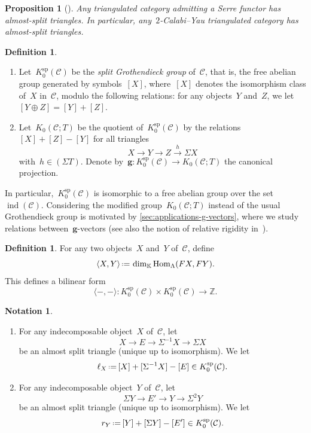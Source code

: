 \documentclass{amsart}
\newtheorem{proposition}[theorem]{Proposition}
\theoremstyle{definition}
\newtheorem{definition}[theorem]{Definition}
\newtheorem{notation}[theorem]{Notation}
\newcommand{\Z}{\mathbb{Z}} %
\renewcommand{\b}[1]{{\boldsymbol{#1}}} %
\newcommand{\eqdef}{\mbox{\,\raisebox{0.2ex}{\scriptsize\ensuremath{\mathrm:}}\ensuremath{=}\,}} %
\newcommand{\darkblue}{\color{darkblue}} %
\newcommand{\defn}[1]{\textsl{\darkblue #1}} %
\newcommand{\field}{\mathbb{K}}
\newcommand{\cat}{\mathcal{C}}
\newcommand{\Hom}[1]{\operatorname{Hom}_{#1}}
\newcommand{\susp}{\Sigma}
\newcommand{\spl}{\operatorname{sp}}
\newcommand{\Ksp}{K_0^{\spl}}
\newcommand{\ind}{\operatorname{ind}}
\begin{document}
\begin{proposition}[{\cite[Prop.~I.2.3]{ReitenVandenbergh}}]
Any triangulated category admitting a Serre functor has almost-split triangles. In particular, any~$2$-Calabi--Yau triangulated category has almost-split triangles.
\end{proposition}

\begin{definition}
\label{def:grothendieck-group}
\begin{enumerate}
\item Let~$\Ksp(\cat)$ be the \defn{split Grothendieck group} of~$\cat$, that is, the free abelian group generated by symbols~$[X]$, where~$[X]$ denotes the isomorphism class of~$X$ in~$\cat$, modulo the following relations: for any objects~$Y$ and~$Z$, we let~$[Y\oplus Z] = [Y] + [Z]$. 
  
\item Let~$K_0(\cat ; T)$ be the quotient of~$\Ksp(\cat)$ by the relations~$[X]+[Z]-[Y]$ for all triangles
\[
X\xrightarrow{} Y \xrightarrow{} Z \xrightarrow{h} \susp X
\]
with~$h \in (\susp T)$. Denote by~$\b{g}:\Ksp(\cat) \to K_0(\cat ; T)$ the canonical projection.
\end{enumerate}
\end{definition}

In particular,~$\Ksp(\cat)$ is isomorphic to a free abelian group over the set~$\ind(\cat)$.
Considering the modified group~$K_0(\cat ; T)$ instead of the usual Grothendieck group is motivated by \cref{sec:applications-g-vectors}, where we study relations between~$\b{g}$-vectors (see also the notion of relative rigidity in~\cite{YangZhu-Relative}).

\begin{definition}
\label{def:bilinear form}
For any two objects~$X$ and~$Y$ of~$\cat$, define
\[
\langle X, Y \rangle \eqdef \dim_{\field} \Hom{\Lambda}(FX,FY).
\]
This defines a bilinear form
\[
\langle -,-\rangle : \Ksp(\cat) \times \Ksp(\cat) \xrightarrow{} \Z.
\]
\end{definition}

\begin{notation}
\label{notation:ell_X}
\begin{enumerate}
\item For any indecomposable object~$X$ of~$\cat$, let
\[
X \to E \to \susp^{-1} X \to \susp X
\]
be an almost split triangle (unique up to isomorphism). We let
\[
\ell_X \eqdef [X] + [\susp^{-1} X]  - [E] \in \Ksp(\cat).
\]
 
\item For any indecomposable object~$Y$ of~$\cat$, let
\[
\susp Y \to E' \to  Y \to \susp^2 Y
\]
be an almost split triangle (unique up to isomorphism). We let
\[
r_Y \eqdef [Y] + [\susp Y]  - [E'] \in \Ksp(\cat).
\]
\end{enumerate}
\end{notation}
\end{document}
